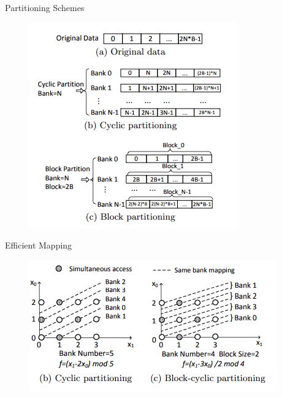 \documentclass[xcolor=dvipsnames]{beamer}
\begin{document}
    \begin{frame}{Partitioning Schemes}

        \begin{figure}
            \includegraphics{PartSchemes.PNG}
        \end{figure}
        
    \end{frame}

    \begin{frame}{Efficient Mapping}

        \begin{figure}
            \includegraphics{CyclevsHybrid.PNG}
        \end{figure}
        
    \end{frame}
\end{document}

